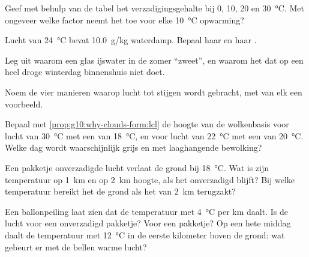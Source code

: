 \begin{exercise}[$\star$]\label{exo:g10:why-clouds-form:2}
Geef met behulp van de tabel het verzadigingsgehalte bij \num{0}, \num{10},
\num{20} en \qty{30}{\degreeCelsius}. Met ongeveer welke factor neemt het toe
voor elke \qty{10}{\degreeCelsius} opwarming?
\end{exercise}

\begin{exercise}[$\star$]\label{exo:g10:why-clouds-form:3}
Lucht van \qty{24}{\degreeCelsius} bevat \qty{10.0}{g/kg} waterdamp. Bepaal haar
 en haar .
\end{exercise}

\begin{exercise}[$\star$]\label{exo:g10:why-clouds-form:4}
Leg uit waarom een glas ijswater in de zomer ``zweet'', en waarom het dat op een
heel droge winterdag binnenshuis niet doet.
\end{exercise}

\begin{exercise}[$\star$]\label{exo:g10:why-clouds-form:5}
Noem de vier manieren waarop lucht tot stijgen wordt gebracht, met van elk een voorbeeld.
\end{exercise}

\begin{exercise}[$\star\star$]\label{exo:g10:why-clouds-form:6}
Bepaal met \cref{prop:g10:why-clouds-form:lcl} de hoogte van de wolkenbasis
voor lucht van \qty{30}{\degreeCelsius} met een  van
\qty{18}{\degreeCelsius}, en voor lucht van \qty{22}{\degreeCelsius} met een
 van \qty{20}{\degreeCelsius}. Welke dag wordt waarschijnlijk grijs en
met laaghangende bewolking?
\end{exercise}

\begin{exercise}[$\star\star$]\label{exo:g10:why-clouds-form:7}
Een pakketje onverzadigde lucht verlaat de grond bij \qty{18}{\degreeCelsius}.
Wat is zijn temperatuur op \qty{1}{km} en op \qty{2}{km} hoogte, als het
onverzadigd blijft? Bij welke temperatuur bereikt het de grond als het van
\qty{2}{km} terugzakt?
\end{exercise}

\begin{exercise}[$\star\star$]\label{exo:g10:why-clouds-form:8}
Een ballonpeiling laat zien dat de temperatuur met \qty{4}{\degreeCelsius} per
km daalt. Is de lucht  voor een onverzadigd pakketje? Voor een 
pakketje? Op een hete middag daalt de temperatuur met \qty{12}{\degreeCelsius}
in de eerste kilometer boven de grond: wat gebeurt er met de bellen warme lucht?
\end{exercise}

